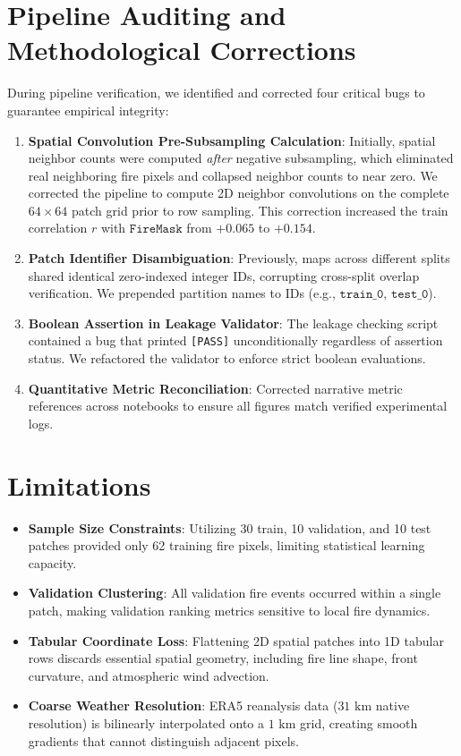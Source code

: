 \documentclass[10pt,journal,compsoc]{IEEEtran}
\begin{document}
\section{Pipeline Auditing and Methodological Corrections}
During pipeline verification, we identified and corrected four critical bugs to guarantee empirical integrity:
\begin{enumerate}
    \item \textbf{Spatial Convolution Pre-Subsampling Calculation}: Initially, spatial neighbor counts were computed \textit{after} negative subsampling, which eliminated real neighboring fire pixels and collapsed neighbor counts to near zero. We corrected the pipeline to compute 2D neighbor convolutions on the complete $64 \times 64$ patch grid prior to row sampling. This correction increased the train correlation $r$ with $\texttt{FireMask}$ from $+0.065$ to $+0.154$.
    \item \textbf{Patch Identifier Disambiguation}: Previously, maps across different splits shared identical zero-indexed integer IDs, corrupting cross-split overlap verification. We prepended partition names to IDs (e.g., $\texttt{train\_0}$, $\texttt{test\_0}$).
    \item \textbf{Boolean Assertion in Leakage Validator}: The leakage checking script contained a bug that printed \texttt{[PASS]} unconditionally regardless of assertion status. We refactored the validator to enforce strict boolean evaluations.
    \item \textbf{Quantitative Metric Reconciliation}: Corrected narrative metric references across notebooks to ensure all figures match verified experimental logs.
\end{enumerate}

\section{Limitations}
\begin{itemize}
    \item \textbf{Sample Size Constraints}: Utilizing 30 train, 10 validation, and 10 test patches provided only 62 training fire pixels, limiting statistical learning capacity.
    \item \textbf{Validation Clustering}: All validation fire events occurred within a single patch, making validation ranking metrics sensitive to local fire dynamics.
    \item \textbf{Tabular Coordinate Loss}: Flattening 2D spatial patches into 1D tabular rows discards essential spatial geometry, including fire line shape, front curvature, and atmospheric wind advection.
    \item \textbf{Coarse Weather Resolution}: ERA5 reanalysis data ($31\text{ km}$ native resolution) is bilinearly interpolated onto a $1\text{ km}$ grid, creating smooth gradients that cannot distinguish adjacent pixels.
\end{itemize}
\end{document}
